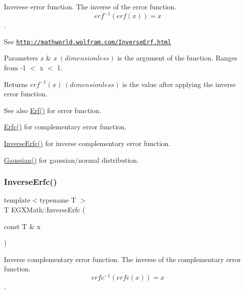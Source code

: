 Inverese error function. The inverse of the error function. \[ erf^{-1}(erf(x)) = x \]. 

See \href{http://mathworld.wolfram.com/InverseErf.html}{\tt http\+://mathworld.\+wolfram.\+com/\+Inverse\+Erf.\+html} 
\begin{DoxyParams}{Parameters}
{\em x} & $x\ (dimensionless)$ is the argument of the function. Ranges from -\/1 $<$ x $<$ 1. \\
\hline
\end{DoxyParams}
\begin{DoxyReturn}{Returns}
$erf^{-1}(x)\ (dimensionless)$ is the value after applying the inverse error function. 
\end{DoxyReturn}
\begin{DoxySeeAlso}{See also}
\mbox{\hyperlink{group___e_g_x_math-_functions-_e_r_f_ga167bde890986906e6cd3b32adaa8e6a8}{Erf()}} for error function. 

\mbox{\hyperlink{group___e_g_x_math-_functions-_e_r_f_ga58f76263d205c47000068176d3116571}{Erfc()}} for complementary error function. 

\mbox{\hyperlink{group___e_g_x_math-_functions-_e_r_f_gad1f81a581f9f2d66a1a4bad2578c3368}{Inverse\+Erfc()}} for inverse complementary error function. 

\mbox{\hyperlink{group___e_g_x_math-_functions-_gaussian_ga647b46315081e299edc16a1c7f4e4032}{Gaussian()}} for gaussian/normal distribution. 
\end{DoxySeeAlso}
\mbox{\label{group___e_g_x_math-_functions-_e_r_f_gad1f81a581f9f2d66a1a4bad2578c3368}} 
\subsubsection{\texorpdfstring{Inverse\+Erfc()}{InverseErfc()}}
{\footnotesize\ttfamily template$<$typename T $>$ \\
T E\+G\+X\+Math\+::\+Inverse\+Erfc (\begin{DoxyParamCaption}\item[{const T \&}]{x }\end{DoxyParamCaption})}



Inverse complementary error function. The inverse of the complementary error function. \[erfc^{-1}(erfc(x)) = x\]. 

